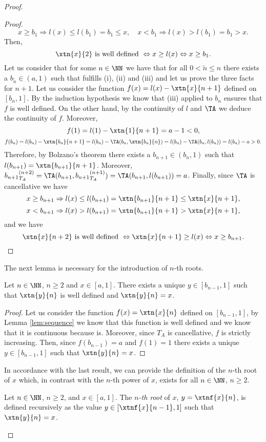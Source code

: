 \begin{proof}
\begin{proof}
		$$x \geq b_1 \Rightarrow l(x) \leq l(b_1)=b_1 \leq x, \quad x < b_1 \Rightarrow l(x)>l(b_1)=b_1>x.$$
		Then,
		$$\xtn{x}{2} \text{ is well defined } \Leftrightarrow x \geq l(x) \Leftrightarrow x \geq b_1.$$
		Let us consider that for some $n \in \NN$ we have that for all $0<\tilde{n} \leq n$ there exists a $b_{\tilde{n}} \in (a,1)$ such that fulfills (i), (ii) and (iii) and let us prove the three facts for $n+1$. Let us consider the function $f(x) = l(x) - \xtn{{x}}{n+1}$ defined on $[b_n,1]$. By the induction hypothesis we know that (iii) applied to $b_n$ ensures that $f$ is well defined. On the other hand, by the continuity of $l$ and $\TA$ we deduce the continuity of $f$. Moreover,
		$$f(1)= l(1) - \xtn{{1}}{n+1} = a - 1 < 0, $$
		$$f(b_n) = l(b_n)-\xtn{{b_{n}}}{n+1} = l(b_n)-\TA(b_n, \xtn{{b_{n}}}{n}) = l(b_n) - \TA(b_n,l(b_n)) =l(b_n) -a >0.$$
		Therefore, by Bolzano's theorem there exists a $b_{n+1} \in (b_n,1)$ such that $l(b_{n+1}) =\xtn{{b_{n+1}}}{n+1}$. Moreover, ${b_{n+1}}_{T_A}^{(n+2)} = \TA(b_{n+1},{b_{n+1}}_{T_A}^{(n+1)}) = \TA(b_{n+1},l(b_{n+1}))=a$.  Finally, since $\TA$ is cancellative we have
		$$x \geq b_{n+1} \Rightarrow l(x) \leq l(b_{n+1})=\xtn{{b_{n+1}}}{n+1} \leq \xtn{x}{n+1},$$
		$$x < b_{n+1} \Rightarrow l(x)>l(b_{n+1})=\xtn{{b_{n+1}}}{n+1}>\xtn{x}{n+1},$$
		and we have
		$$\xtn{x}{n+2} \text{ is well defined } \Leftrightarrow \xtn{x}{n+1} \geq l(x) \Leftrightarrow x \geq b_{n+1}.$$	
	\end{proof}
	The next lemma is necessary for the introduction of $n$-th roots.
	\begin{sublemma}\label{lem:rationalpowers} Let $n \in \NN$, $n \geq 2$ and $x \in [a,1]$. There exists a unique $y \in [b_{n-1},1]$ such that $\xtn{y}{n}$ is well defined and $\xtn{y}{n}=x$.
	\end{sublemma}
	\begin{proof}
		Let us consider the function $f(x)= \xtn{x}{n}$ defined on $[b_{n-1},1]$, by Lemma \ref{lem:sequence} we know that this function is well defined and we know that it is continuous because \TA is. Moreover, since $T_A$ is cancellative, $f$ is strictly increasing. Then, since $f(b_{n-1})=a$ and $f(1)=1$ there exists a unique $y \in [b_{n-1},1]$ such that $\xtn{y}{n}=x$.
	\end{proof}
	In accordance with the last result, we can provide the definition of the $n$-th root of $x$ which, in contrast with the $n$-th power of $x$, exists for all $n \in \NN$, $n \geq 2$.
	\begin{subdefinition}\label{subdef:rationalpowersofpretnorm}
		Let $n \in \NN$, $n \geq 2$, and $x \in [a,1]$. The \emph{$n$-th root} of $x$, $y=\xtnf{x}{n}$, is defined recursively as the value $y \in [\xtnf{x}{n-1},1]$ such that $\xtn{y}{n}=x$.
	\end{subdefinition}
	

\end{proof}
